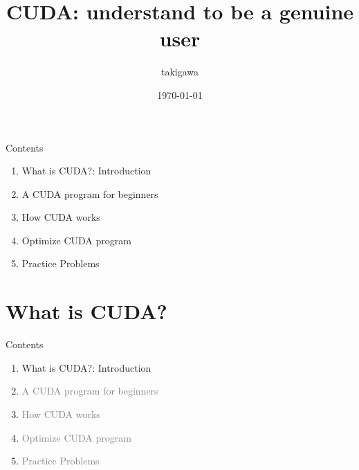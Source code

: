 \documentclass[dvipdfmx, 11pt, aspectratio=169]{beamer}   %
\title{CUDA: understand to be a genuine user}
\author{takigawa}
\institute{The university of Tokyo, EEIC, Taura Lab}
\date{\today}
\begin{document}
\begin{frame}
  \titlepage       
\end{frame}
\begin{frame}{Contents}
  \begin{enumerate}%
    \item What is CUDA?: Introduction
    \item A CUDA program for beginners
    \item How CUDA works
    \item Optimize CUDA program
    \item Practice Problems
  \end{enumerate}
\end{frame}
\section{What is CUDA?}
\begin{frame}{Contents}
  \begin{enumerate}%
    \item What is CUDA?: Introduction
    \item \textcolor{gray}{A CUDA program for beginners}
    \item \textcolor{gray}{How CUDA works}
    \item \textcolor{gray}{Optimize CUDA program}
    \item \textcolor{gray}{Practice Problems}
  \end{enumerate}
\end{frame}
\end{document}
